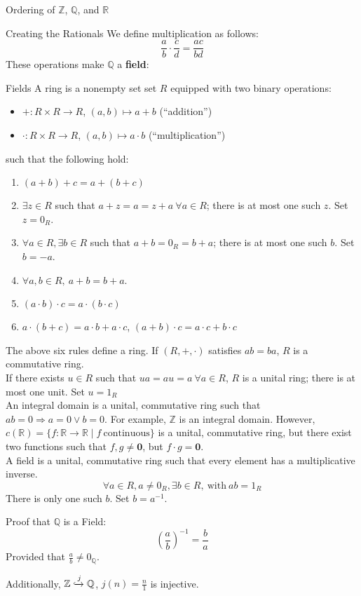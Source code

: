 \documentclass[8pt]{extarticle}
\newcommand{\Q}{\mathbb{Q}}
\newcommand{\Z}{\mathbb{Z}}
\newcommand{\R}{\mathbb{R}}
\begin{document}
\begin{problem}{Ordering of $\Z$, $\Q$, and $\R$}
\begin{problem}{Creating the Rationals}
      We define multiplication as follows:
      \[
        \frac{a}{b} \cdot \frac{c}{d} = \frac{ac}{bd}
      \] 
      These operations make $\Q$ a \textbf{field}:
      \begin{problem}{Fields}
        A ring is a nonempty set set $R$ equipped with two binary operations:
        \begin{itemize}
          \item $+: R\times R \rightarrow R$, $(a,b) \mapsto a+b$ (``addition'')
          \item $\cdot: R\times R \rightarrow R$, $(a,b) \mapsto a\cdot b$ (``multiplication'')
        \end{itemize}
        such that the following hold:
        \begin{enumerate}[(1)]
          \item $(a+b)+c = a+(b+c)$
          \item $\exists z\in R$ such that $a+z = a = z+a~\forall a\in R$; there is at most one such $z$. Set $z = 0_R$.
          \item $\forall a\in R,\exists b\in R$ such that $a+b = 0_R = b+a$; there is at most one such $b$. Set $b = -a$.
          \item $\forall a,b\in R,~a+b = b+a$.
          \item $(a\cdot b)\cdot c = a\cdot(b\cdot c)$
          \item $a\cdot(b+c) = a\cdot b + a\cdot c$, $(a+b)\cdot c = a\cdot c + b\cdot c$
        \end{enumerate}
        The above six rules define a ring. If $(R,+,\cdot)$ satisfies $ab = ba$, $R$ is a commutative ring.\\

        If there exists $u\in R$ such that $ua = au = a~\forall a\in R$, $R$ is a unital ring; there is at most one unit. Set $u = 1_R$\\

        An integral domain is a unital, commutative ring such that $ab = 0 \Rightarrow a=0\vee b=0$. For example, $\Z$ is an integral domain. However, $c(\R) = \{f:\R \rightarrow \R\mid f~\text{continuous}\}$ is a unital, commutative ring, but there exist two functions such that $f,g\neq \mathbf{0}$, but $f\cdot g = \mathbf{0}$.\\

        A field is a unital, commutative ring such that every element has a multiplicative inverse.
        \[
          \forall a\in R, a\neq 0_R,\exists b\in R,~\text{with}~ab = 1_R
        \] 
        There is only one such $b$. Set $b = a^{-1}$.
      \end{problem}
      \begin{problem}{Proof that $\Q$ is a Field:}
        \[
          \left(\frac{a}{b}\right)^{-1} = \frac{b}{a}
        \] 
        Provided that $\frac{a}{b}\neq 0_{\Q}$.
      \end{problem}
      Additionally, $\Z\xhookrightarrow{j}\Q$, $j(n) = \frac{n}{1}$ is injective.
    \end{problem}
  \end{problem}
\end{document}
